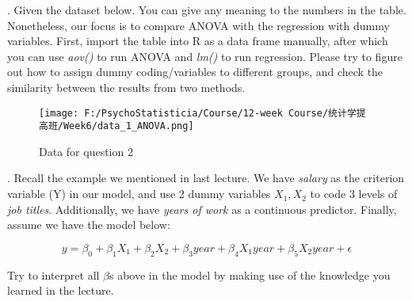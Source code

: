 \documentclass[10pt,a4paper]{article}
\begin{document}
	. Given the dataset below. You can give any meaning to the numbers in the table. Nonetheless, our focus is to compare ANOVA with the regression with dummy variables. First, import the table into R as a data frame manually, after which you can use \textit{aov()} to run ANOVA and \textit{lm()} to run regression. Please try to figure out how to assign dummy coding/variables to different groups, and check the similarity between the results from two methods.
	
	\begin{figure}[H]
		\centering
		\texttt{[image: F:/PsychoStatisticia/Course/12-week Course/统计学提高班/Week6/data\_1\_ANOVA.png]}
		\caption{Data for question 2}
	\end{figure}
	
	. Recall the example we mentioned in last lecture. We have \textit{salary} as the criterion variable (Y) in our model, and use 2 dummy variables $X_1, X_2$ to code 3 levels of \textit{job titles}. Additionally, we have \textit{years of work} as a continuous predictor. Finally, assume we have the model below:
	
	\begin{equation}
		y=\beta_0+\beta_1X_1+\beta_2X_2+\beta_3year+\beta_4X_1year+\beta_5X_2year+\epsilon
	\end{equation}
	
	Try to interpret all $\beta$s above in the model by making use of the knowledge you learned in the lecture.
\end{document}
